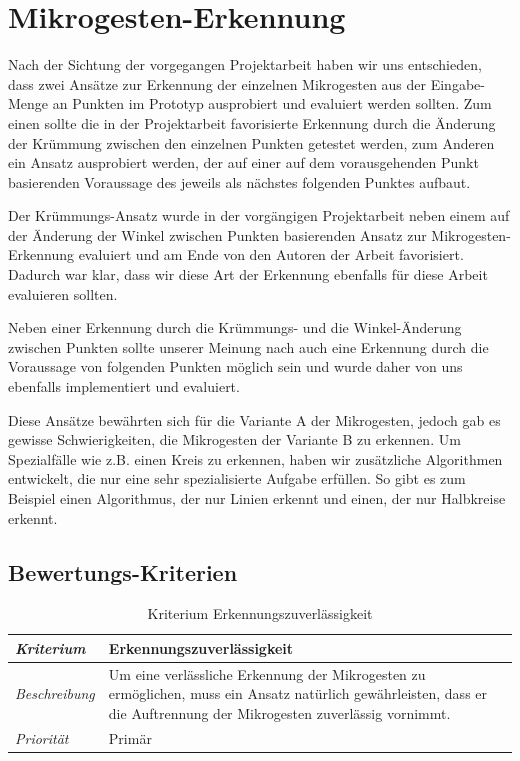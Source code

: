 \chapter{Mikrogesten-Erkennung}

Nach der Sichtung der vorgegangen Projektarbeit haben wir uns entschieden, dass zwei Ansätze zur Erkennung der einzelnen Mikrogesten aus der Eingabe-Menge an Punkten im Prototyp ausprobiert und evaluiert werden sollten. Zum einen sollte die in der Projektarbeit favorisierte Erkennung durch die Änderung der Krümmung zwischen den einzelnen Punkten getestet werden, zum Anderen ein Ansatz ausprobiert werden, der auf einer auf dem vorausgehenden Punkt basierenden Voraussage des jeweils als nächstes folgenden Punktes aufbaut.

Der Krümmungs-Ansatz wurde in der vorgängigen Projektarbeit neben einem auf der Änderung der Winkel zwischen Punkten basierenden Ansatz zur Mikrogesten-Erkennung evaluiert und am Ende von den Autoren der Arbeit favorisiert. Dadurch war klar, dass wir diese Art der Erkennung ebenfalls für diese Arbeit evaluieren sollten.

Neben einer Erkennung durch die Krümmungs- und die Winkel-Änderung zwischen Punkten sollte unserer Meinung nach auch eine Erkennung durch die Voraussage von folgenden Punkten möglich sein und wurde daher von uns ebenfalls implementiert und evaluiert.

Diese Ansätze bewährten sich für die Variante A der Mikrogesten, jedoch gab es gewisse Schwierigkeiten, die Mikrogesten der Variante B zu erkennen. Um Spezialfälle wie z.B. einen Kreis zu erkennen, haben wir zusätzliche Algorithmen entwickelt, die nur eine sehr spezialisierte Aufgabe erfüllen. So gibt es zum Beispiel einen Algorithmus, der nur Linien erkennt und einen, der nur Halbkreise erkennt.

\section{Bewertungs-Kriterien}

\begin{table}[h!]
  \begin{center}
    \begin{tabular}{ m{2.2cm} |  p{10cm} }
    \emph{Kriterium} & Erkennungszuverlässigkeit  \\ \hline
    \emph{Beschreibung} & Um eine verlässliche Erkennung der Mikrogesten zu ermöglichen, muss ein Ansatz natürlich gewährleisten, dass er die Auftrennung der Mikrogesten zuverlässig vornimmt. \\ \hline
    \emph{Priorität} & Primär  \\
    \end{tabular}
  \end{center}
  \caption{Kriterium Erkennungszuverl\"{a}ssigkeit}
  \label{kriterium_erkennungszuverlaessigkeit}
\end{table}

